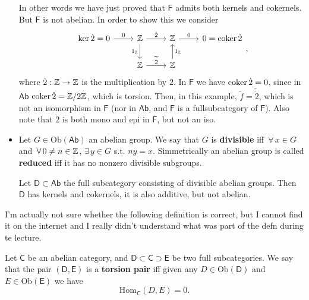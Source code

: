 \begin{ex}
\begin{itemize}
			In other words we have just proved that $\mathsf{F}$ admits both kernels and cokernels.
			But $\mathsf{F}$ is not abelian.
			In order to show this we consider
			\begin{equation}
			\begin{tikzcd}
				\ker \dot{2} = 0 \arrow[r, "0", rightarrow] & \Z \arrow[r, "\dot{2}", rightarrow] \arrow[d, "1_\Z"', rightarrow] &
				\Z \arrow[r, "0", rightarrow] & 0 = \coker \dot{2}\\
				 & \Z \arrow[r, "\widetilde{\dot{2}}", rightarrow] & \Z \arrow[u, "1_\Z"', rightarrow] & 
			\end{tikzcd}
			,\end{equation} 
			where $\dot{2}: \mathbb{Z} \to \mathbb{Z}$ is the multiplication by $2$.
			In $\mathsf{F}$ we have $\operatorname{coker} \dot{2} = 0$, since in $\mathsf{Ab}$ $\operatorname{coker} \dot{2} = \mathbb{Z}/2\mathbb{Z}$, which is torsion.
			Then, in this example, $\widetilde{f} = \widetilde{\dot{2}}$, which is not an isomorphism in $\mathsf{F}$ (nor in $\mathsf{Ab}$, and $\mathsf{F}$ is a fullsubcategory of $\mathsf{F}$).
			Also note that $\dot{2}$ is both mono and epi in $\mathsf{F}$, but not an iso.
		\item Let $G \in \mathrm{Ob} \left(\mathsf{Ab}\right)$ an abelian group. 
			We say that $G$ is \textbf{divisible} iff $\,\forall\, x \in G$ and $\,\forall\,  0 \neq n \in \mathbb{Z}$, $\exists\, y \in G$ s.t. $ny = x$.
			Simmetrically an abelian group is called \textbf{reduced} iff it has no nonzero divisible subgroups.

			Let $\mathsf{D} \subset \mathsf{Ab}$ the full subcategory consisting of divisible abelian groups.
			Then $\mathsf{D}$ has kernels and cokernels, it is also additive, but not abelian.
	\end{itemize}
\end{ex} 

I'm actually not sure whether the following definition is correct, but I cannot find it on the internet and I really didn't understand what was part of the defn during te lecture.
\begin{defn}
	Let $\mathsf{C}$ be an abelian category, and $\mathsf{D} \subset \mathsf{C} \supset \mathsf{E}$ be two full subcategories.
	We say that the pair $\left(\mathsf{D}, \mathsf{E}\right)$ is a \textbf{torsion pair} iff given any $D \in \mathrm{Ob} \left(\mathsf{D}\right)$ and $E \in \mathrm{Ob} \left(\mathsf{E}\right)$ we have
	\begin{equation}
	\mathrm{Hom}_{\mathsf{C}} \left( D, E \right) = 0
	.\end{equation} 
\end{defn}

